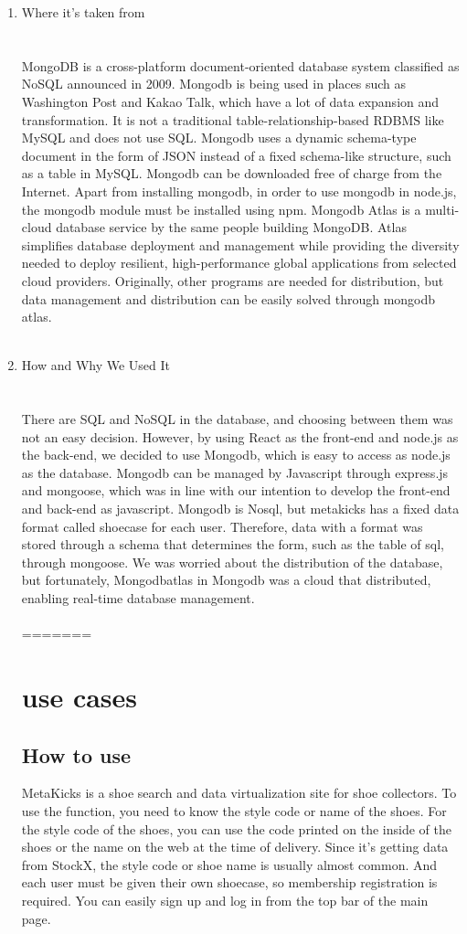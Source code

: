 \documentclass[conference]{IEEEtran}
\begin{document}
\begin{enumerate}
\item Where it's taken from\\
\\\\MongoDB is a cross-platform document-oriented database system classified as NoSQL announced in 2009. Mongodb is being used in places such as Washington Post and Kakao Talk, which have a lot of data expansion and transformation. It is not a traditional table-relationship-based RDBMS like MySQL and does not use SQL. Mongodb uses a dynamic schema-type document in the form of JSON instead of a fixed schema-like structure, such as a table in MySQL. Mongodb can be downloaded free of charge from the Internet. Apart from installing mongodb, in order to use mongodb in node.js, the mongodb module must be installed using npm. Mongodb Atlas is a multi-cloud database service by the same people building MongoDB. Atlas simplifies database deployment and management while providing the diversity needed to deploy resilient, high-performance global applications from selected cloud providers. Originally, other programs are needed for distribution, but data management and distribution can be easily solved through mongodb atlas.\\\\
\item How and Why We Used It\\
\\\\There are SQL and NoSQL in the database, and choosing between them was not an easy decision. However, by using React as the front-end and node.js as the back-end, we decided to use Mongodb, which is easy to access as node.js as the database. Mongodb can be managed by Javascript through express.js and mongoose, which was in line with our intention to develop the front-end and back-end as javascript. Mongodb is Nosql, but metakicks has a fixed data format called shoecase for each user. Therefore, data with a format was stored through a schema that determines the form, such as the table of sql, through mongoose. We was worried about the distribution of the database, but fortunately, Mongodbatlas in Mongodb was a cloud that distributed, enabling real-time database management.\\\\
=======
\section{use cases}
\subsection{How to use}
MetaKicks is a shoe search and data virtualization site for shoe collectors. To use the function, you need to know the style code or name of the shoes. For the style code of the shoes, you can use the code printed on the inside of the shoes or the name on the web at the time of delivery. Since it's getting data from StockX, the style code or shoe name is usually almost common. And each user must be given their own shoecase, so membership registration is required. You can easily sign up and log in from the top bar of the main page.\\

\end{enumerate}
\end{document}
